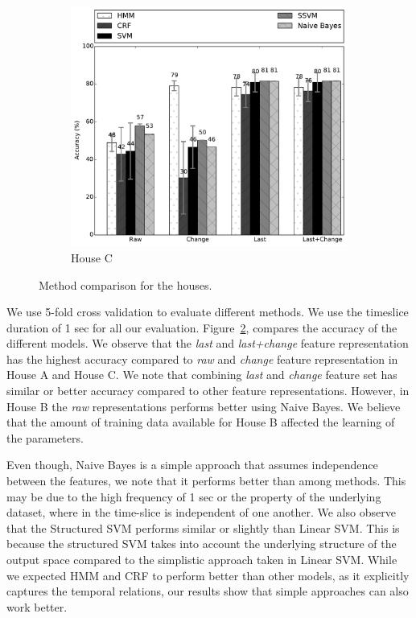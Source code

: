 \begin{figure}
	\begin{subfigure}[b]{0.4\textwidth}
		\includegraphics[height=\textwidth]{../../src/reports/C.pdf}
		\caption{House C}
		\label{fig:chouseC}
	\end{subfigure}
	\caption{Method comparison for the houses.}\label{fig:comparison}
\end{figure}


We use 5-fold cross validation to evaluate different methods. We use the timeslice duration of 1 sec for all our evaluation. 
Figure~\ref{fig:comparison}, compares the accuracy of the different models. 
We observe that the \emph{last} and \emph{last+change} feature representation has the highest accuracy compared to \emph{raw} and \emph{change} feature representation in House A and House C. We note that combining \emph{last} and \emph{change} feature set  has similar or better accuracy compared to other feature representations. However, in House B the \emph{raw} representations performs better using Naive Bayes. We believe that the amount of training data available for House B affected the learning of the parameters. 

Even though, Naive Bayes is a simple approach that assumes independence between the features, we note that it performs better than among methods. This may be due to the high frequency of 1 sec or the property of the underlying dataset, where in the time-slice is independent of one another. We also observe that the Structured SVM performs similar or slightly than Linear SVM. This is because the structured SVM takes into account the underlying structure of the output space compared to the simplistic approach taken in Linear SVM. While we expected HMM and CRF to perform better than other models, as it explicitly captures the temporal relations, our results show that simple approaches can also work better. 



